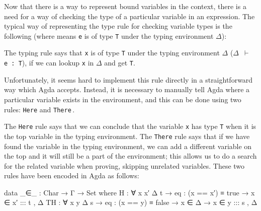 \documentclass{article}
\begin{document}
Now that there is a way to represent bound variables in the context, there is a need for a way of checking the type
of a particular variable in an expression. The typical way of representing the type rule for checking variable types
is the following (where means \texttt{e} is of type \texttt{T} under the
typing environment \texttt{$\Delta$}):

\begin{figure}[H]
\begin{mathpar}
\end{mathpar}
\label{fig:variabletyperule}
\end{figure}

The typing rule says that \texttt{x} is of type \texttt{T} under the typing environment \texttt{$\Delta$} (\texttt{$\Delta$ $\vdash$ e : T}), if we can lookup
\texttt{x} in \texttt{$\Delta$} and get \texttt{T}.

Unfortunately, it seems hard to implement this rule directly in a straightforward way which Agda accepts. Instead, it is necessary
to manually tell Agda where a particular variable exists in the environment, and this can be done using two rules: \texttt{Here}
and \texttt{There}\,\cite{pouillard2013splgstlc}.

\begin{figure}[H]
\label{fig:herethererule}
\end{figure}

The \texttt{Here} rule says that we can conclude that the variable \texttt{x} has type \texttt{T} when it is the top
variable in the typing environment. The \texttt{There} rule says that if we have found the variable in the typing environment, we
can add a different variable on the top and it will still be a part of the environment; this allows us to do a search for the related variable
when proving, skipping unrelated variables.
These two rules have been encoded in Agda as follows:

\begin{code}
  data _∈_ :  Char → Γ → Set where
    H  : ∀ {x x′ Δ t } → {{eq : (x == x′) ≡ true}} → x ∈ x′ ::: t , Δ
    TH : ∀ {x y Δ s } → {{eq : (x == y) ≡ false}} → x ∈ Δ → x ∈ y ::: s , Δ
\end{code}
\end{document}
